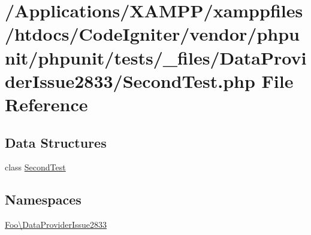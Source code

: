 \hypertarget{_data_provider_issue2833_2_second_test_8php}{}\section{/\+Applications/\+X\+A\+M\+P\+P/xamppfiles/htdocs/\+Code\+Igniter/vendor/phpunit/phpunit/tests/\+\_\+files/\+Data\+Provider\+Issue2833/\+Second\+Test.php File Reference}
\label{_data_provider_issue2833_2_second_test_8php}
\subsection*{Data Structures}
\begin{DoxyCompactItemize}
\item 
class \mbox{\hyperlink{class_foo_1_1_data_provider_issue2833_1_1_second_test}{Second\+Test}}
\end{DoxyCompactItemize}
\subsection*{Namespaces}
\begin{DoxyCompactItemize}
\item 
 \mbox{\hyperlink{namespace_foo_1_1_data_provider_issue2833}{Foo\textbackslash{}\+Data\+Provider\+Issue2833}}
\end{DoxyCompactItemize}
